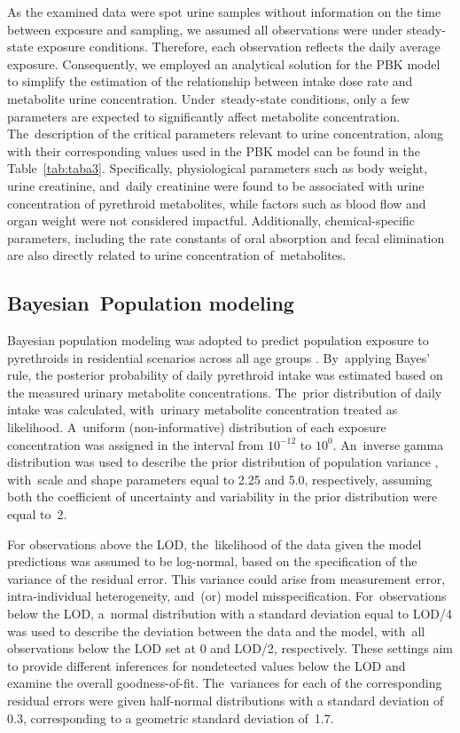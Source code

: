 \documentclass[toxics,article,accept,pdftex,moreauthors]{Definitions/mdpi}
\begin{document}
As the examined data were spot urine samples without information on the
time between exposure and sampling, we assumed all observations were
under steady-state exposure conditions. Therefore, each observation
reflects the daily average exposure. Consequently, we employed an
analytical solution for the PBK model to simplify the estimation of the
relationship between intake dose rate and metabolite urine
concentration. Under~steady-state conditions, only a few parameters are
expected to significantly affect metabolite concentration. The~description of the critical parameters relevant to urine concentration,
along with their corresponding values used in the PBK model can be found in
the Table~\ref{tab:taba3}. Specifically, physiological parameters such
as body weight, urine creatinine, and~daily creatinine were found to be
associated with urine concentration of pyrethroid metabolites, while factors such as blood flow
and organ weight were not considered impactful. Additionally,
chemical-specific parameters, including the rate constants of oral
absorption and fecal elimination are also directly related to
urine concentration of~metabolites.

\subsection{Bayesian~Population modeling}\label{bayesian-population-modeling} %

Bayesian population modeling was adopted to predict population exposure
to pyrethroids in residential scenarios across all age groups
\citep{allen2007use, lyons2008computational}. By~applying Bayes' rule,
the posterior probability of daily pyrethroid intake was estimated based
on the measured urinary metabolite concentrations. The~prior
distribution of daily intake was calculated, with~urinary metabolite
concentration treated as likelihood. A~uniform (non-informative)
distribution of each exposure concentration was assigned in the interval
from \(10^{-12}\) to \(10^0\). An~inverse gamma distribution was used to
describe the prior distribution of population variance
\citep{lyons2008computational}, with~scale and shape parameters equal to
2.25 and 5.0, respectively, assuming both the coefficient of uncertainty
and variability in the prior distribution were equal to~2.

For observations above the LOD, the~likelihood of the data given the
model predictions was assumed to be log-normal, based on the
specification of the variance of the residual error. This variance could
arise from measurement error, intra-individual heterogeneity, and~(or)
model misspecification. For~observations below the LOD, a~normal
distribution with a standard deviation equal to LOD/4 was used to
describe the deviation between the data and the model, with~all
observations below the LOD set at 0 and LOD/2, respectively. These
settings aim to provide different inferences for nondetected values
below the LOD and examine the overall goodness-of-fit. The~variances for
each of the corresponding residual errors were given half-normal
distributions with a standard deviation of 0.3, corresponding to a
geometric standard deviation of~1.7.
\end{document}
